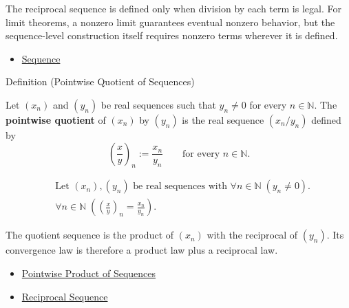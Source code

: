 \begin{remark*}[Interpretation]
The reciprocal sequence is defined only when division by each term is legal.
For limit theorems, a nonzero limit guarantees eventual nonzero behavior, but
the sequence-level construction itself requires nonzero terms wherever it is
defined.
\end{remark*}

\begin{dependencies}
\begin{itemize}
  \item \hyperref[def:sequence]{Sequence}
\end{itemize}
\end{dependencies}


\begin{definitionbox}{Definition (Pointwise Quotient of Sequences)}
\begin{definition}
\label{def:pointwise-quotient-sequence}
Let $(x_n)$ and $(y_n)$ be real sequences such that $y_n\neq 0$ for every
$n\in\mathbb{N}$. The \textbf{pointwise quotient} of $(x_n)$ by $(y_n)$ is
the real sequence $(x_n/y_n)$ defined by
\[
\left(\frac{x}{y}\right)_n := \frac{x_n}{y_n}
\qquad
\text{for every } n\in\mathbb{N}.
\]
\end{definition}
\end{definitionbox}

\begin{remark*}
\[
\begin{aligned}
&\text{Let } (x_n),(y_n) \text{ be real sequences with }
  \forall n\in\mathbb{N}\;(y_n\neq 0).\\
&\forall n\in\mathbb{N}\;
\left(\left(\frac{x}{y}\right)_n=\frac{x_n}{y_n}\right).
\end{aligned}
\]
\end{remark*}

\begin{remark*}[Interpretation]
The quotient sequence is the product of $(x_n)$ with the reciprocal of
$(y_n)$. Its convergence law is therefore a product law plus a reciprocal law.
\end{remark*}

\begin{dependencies}
\begin{itemize}
  \item \hyperref[def:pointwise-product-sequence]{Pointwise Product of Sequences}
  \item \hyperref[def:reciprocal-sequence]{Reciprocal Sequence}
\end{itemize}
\end{dependencies}

